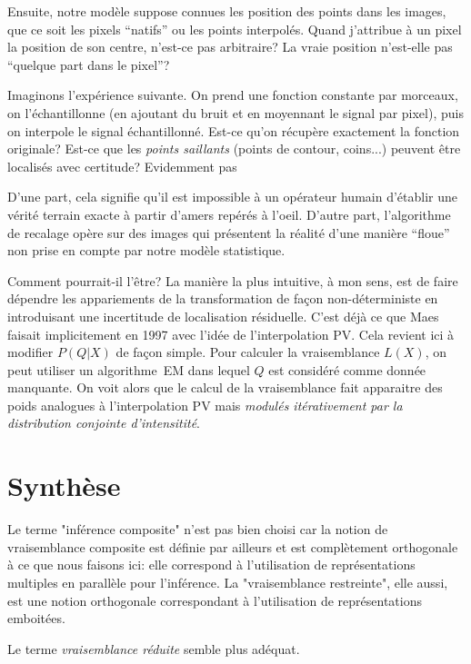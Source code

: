 \documentclass{article}
\begin{document}
Ensuite, notre mod\`ele suppose connues les position des points dans les images, que ce soit les pixels ``natifs'' ou les points interpol\'es. Quand j'attribue \`a un pixel la position de son centre, n'est-ce pas arbitraire? La vraie position n'est-elle pas ``quelque part dans le pixel''? 

Imaginons l'exp\'erience suivante. On prend une fonction constante par morceaux, on l'\'echantillonne (en ajoutant du bruit et en moyennant le signal par pixel), puis on interpole le signal \'echantillonn\'e. Est-ce qu'on r\'ecup\`ere exactement la fonction originale? Est-ce que les {\em points saillants} (points de contour, coins...) peuvent \^etre localis\'es avec certitude? Evidemment pas

D'une part, cela signifie qu'il est impossible \`a un op\'erateur humain d'\'etablir une v\'erit\'e terrain exacte \`a partir d'amers rep\'er\'es \`a l'oeil. D'autre part, l'algorithme de recalage op\`ere sur des images qui pr\'esentent la r\'ealit\'e d'une mani\`ere ``floue'' non prise en compte par notre mod\`ele statistique.

Comment pourrait-il l'\^etre? La mani\`ere la plus intuitive, \`a mon sens, est de faire d\'ependre les appariements de la transformation de fa\c con non-d\'eterministe en introduisant une incertitude de localisation r\'esiduelle. C'est d\'ej\`a ce que Maes faisait implicitement en 1997 avec l'id\'ee de l'interpolation PV. Cela revient ici \`a modifier $P(Q|X)$ de fa\c{c}on simple. Pour calculer la vraisemblance $L(X)$, on peut utiliser un algorithme~EM dans lequel $Q$ est consid\'er\'e comme donn\'ee manquante. On voit alors que le calcul de la vraisemblance fait apparaitre des poids analogues \`a l'interpolation PV mais {\em modul\'es it\'erativement par la distribution conjointe d'intensitit\'e}. 


\section{Synth\`ese}

Le terme "inférence composite" n'est pas bien choisi car la notion de vraisemblance composite est d\'efinie par ailleurs et est compl\`etement orthogonale \`a ce que nous faisons ici: elle correspond \`a l'utilisation de repr\'esentations multiples en parall\`ele pour l'inf\'erence. La "vraisemblance restreinte", elle aussi, est une notion orthogonale correspondant \`a l'utilisation de repr\'esentations emboit\'ees.

Le terme {\em vraisemblance r\'eduite} semble plus ad\'equat.  
\end{document}
